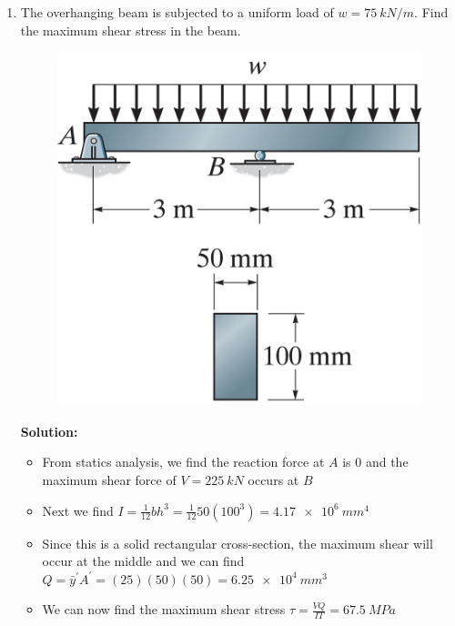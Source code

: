 \documentclass[12pt, oneside]{article}
\begin{document}
\begin{enumerate}
	\item %
		The overhanging beam is subjected to a uniform load of $w= 	\SI{75}{kN/m} $.
		Find the maximum shear stress in the beam.
		\begin{figure}[H]
			\centering
			\includegraphics[width=0.5\linewidth]{7-11}
		\end{figure}
		\textbf{Solution:}
		\begin{itemize}
			\item From statics analysis, we find the reaction force at $A$ is 0 and the maximum shear force of $V = \SI{225}{kN}$ occurs at $B$
			\item Next we find $I = \frac{1}{12}bh^3 = \frac{1}{12}50(100^3) = \SI{4.17e6}{mm^4}$
			\item Since this is a solid rectangular cross-section, the maximum shear will occur at the middle and we can find $Q = \bar{y}^\prime A^\prime = (25)(50)(50) = \SI{6.25e4}{mm^3}$
			\item We can now find the maximum shear stress $\tau = \frac{VQ}{IT} = \SI{67.5 }{MPa}$
		\end{itemize}


\end{enumerate}
\end{document}
